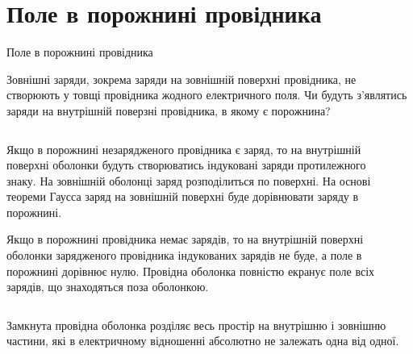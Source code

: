 \documentclass[onlytextwidth]{beamer}
\begin{document}
\section{Поле в порожнині провідника}




\begin{frame}{Поле в порожнині провідника}
	\begin{block}{}\justifying
		Зовнішні заряди, зокрема заряди на зовнішній поверхні провідника, не створюють у товщі
		провідника жодного електричного поля. \alert{Чи будуть з'являтись заряди на внутрішній поверзні
			провідника, в якому є порожнина?}
	\end{block}
	\begin{columns}
		\begin{column}{0.7\linewidth}
			\begin{overprint}
				\begin{block}{}\justifying
					Якщо в \alert{порожнині незарядженого провідника є заряд}, то на внутрішній
					поверхні оболонки будуть створюватись індуковані заряди протилежного знаку. На
					зовнішній оболонці заряд розподілиться по поверхні. На основі теореми Гаусса заряд
					на зовнішній поверхні буде дорівнювати заряду в порожнині.
				\end{block}
				\begin{block}{}\justifying
					Якщо в \alert{порожнині провідника немає зарядів}, то на внутрішній поверхні
					оболонки зарядженого провідника індукованих зарядів не буде, а поле в порожнині
					дорівнює нулю. Провідна оболонка повністю екранує поле всіх зарядів, що знаходяться
					поза оболонкою.
				\end{block}
			\end{overprint}
		\end{column}
		\begin{column}{0.3\linewidth}\centering
			\begin{overprint}\centering
				\onslide<1>
				
				\onslide<2>
				
			\end{overprint}
		\end{column}
	\end{columns}
	\begin{alertblock}{}\justifying
		Замкнута провідна оболонка розділяє весь простір на внутрішню і зовнішню частини, які в
		електричному відношенні абсолютно \alert{не залежать одна від одної}.
	\end{alertblock}
\end{frame}
\end{document}
